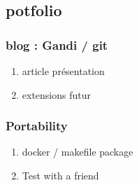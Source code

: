 \documentclass[11pt]{article}
\begin{document}
\subsection{potfolio}
\label{sec:orgf854df9}
\subsubsection{blog : Gandi / git}
\label{sec:org1d2683c}
\begin{enumerate}
\item article présentation
\label{sec:org358c771}
\item extensions futur
\label{sec:org045bbc2}
\end{enumerate}
\subsubsection{Portability}
\label{sec:orged790cc}
\begin{enumerate}
\item docker / makefile package
\label{sec:orgc1ea952}
\item Test with a friend
\label{sec:org2d74594}
\end{enumerate}
\end{document}
